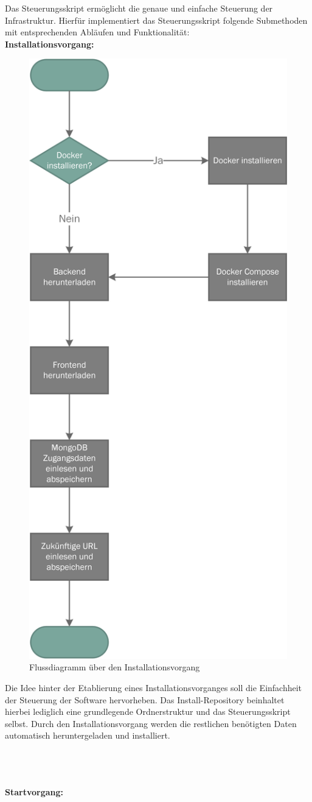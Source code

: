 Das Steuerungsskript ermöglicht die genaue und einfache Steuerung der Infrastruktur.
Hierfür implementiert das Steuerungsskript folgende Submethoden mit entsprechenden Abläufen und Funktionalität:\\

\textbf{Installationsvorgang:}

\begin{figure}[H]
	\centering
	\includegraphics[width=0.5\linewidth]{images/mbeier_konzept/Install}
	\caption[Flussdiagramm über den Installationsvorgang]{Flussdiagramm über den Installationsvorgang}
	\label{fig:install}
\end{figure}

\newpage

Die Idee hinter der Etablierung eines Installationsvorganges soll die Einfachheit der Steuerung der Software hervorheben. Das Install-Repository beinhaltet hierbei lediglich eine grundlegende Ordnerstruktur und das Steuerungsskript selbst. Durch den Installationsvorgang werden die restlichen benötigten Daten automatisch heruntergeladen und installiert.

~\\~\\~\\
\textbf{Startvorgang:}

